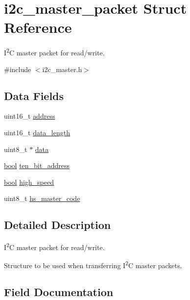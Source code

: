 \hypertarget{structi2c__master__packet}{}\section{i2c\+\_\+master\+\_\+packet Struct Reference}
\label{structi2c__master__packet}


I\textsuperscript{2}C master packet for read/write.  




{\ttfamily \#include $<$i2c\+\_\+master.\+h$>$}

\subsection*{Data Fields}
\begin{DoxyCompactItemize}
\item 
uint16\+\_\+t \mbox{\hyperlink{structi2c__master__packet_a643d30df67a67c5915fde941c934f9f8}{address}}
\item 
uint16\+\_\+t \mbox{\hyperlink{structi2c__master__packet_a4984cd1ac153dd3a0b24706eb8f9b904}{data\+\_\+length}}
\item 
uint8\+\_\+t $\ast$ \mbox{\hyperlink{structi2c__master__packet_abe222f6d3581e7920dcad5306cc906a8}{data}}
\item 
\mbox{\hyperlink{group__group__sam0__utils_ga97a80ca1602ebf2303258971a2c938e2}{bool}} \mbox{\hyperlink{structi2c__master__packet_a3a307f1d645980c963f88064226ac3b5}{ten\+\_\+bit\+\_\+address}}
\item 
\mbox{\hyperlink{group__group__sam0__utils_ga97a80ca1602ebf2303258971a2c938e2}{bool}} \mbox{\hyperlink{structi2c__master__packet_a8a6cc2210d6a22d91f730407470ba476}{high\+\_\+speed}}
\item 
uint8\+\_\+t \mbox{\hyperlink{structi2c__master__packet_a5969c6aada0ef9d21a5866cd3b585c02}{hs\+\_\+master\+\_\+code}}
\end{DoxyCompactItemize}


\subsection{Detailed Description}
I\textsuperscript{2}C master packet for read/write. 

Structure to be used when transferring I\textsuperscript{2}C master packets. 

\subsection{Field Documentation}
\mbox{\label{structi2c__master__packet_a643d30df67a67c5915fde941c934f9f8}} 
